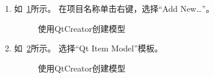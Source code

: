 \begin{enumerate}

\item 如\figurename\ \ref{p000044}所示。
在项目名称单击右键，选择“Add New\ldots”。
\FloatBarrier
\begin{figure}[htb] %
\marginnote{\setlength\fboxsep{2pt}\fbox{\footnotesize{\kaishu\figurename\,}\footnotesize{\ref{p000044}}}}\centering %
\setlength\fboxsep{0pt} %
\caption{使用QtCreator创建模型} %
\label{p000044} %
\end{figure}


\item 如\figurename\ \ref{p000045}所示。
选择“Qt Item Model”模板。
\FloatBarrier
\begin{figure}[htb] %
\marginnote{\setlength\fboxsep{2pt}\fbox{\footnotesize{\kaishu\figurename\,}\footnotesize{\ref{p000045}}}}\centering %
\setlength\fboxsep{0pt} %
\caption{使用QtCreator创建模型} %
\label{p000045} %
\end{figure}



\end{enumerate}

